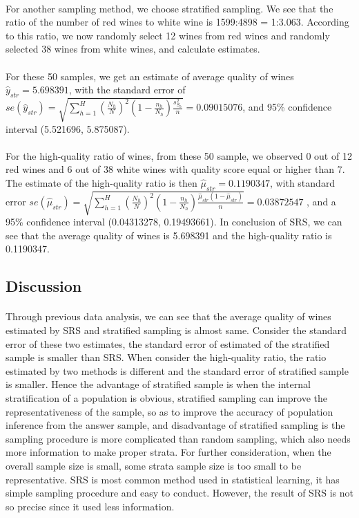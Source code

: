 \documentclass{article}
\begin{document}
\paragraph{}
For another sampling method, we choose stratified sampling. We see that the ratio of the number of red wines to white wine is 1599:4898 = 1:3.063. According to this ratio, we now randomly select 12 wines from red wines and randomly selected 38 wines from white wines, and calculate estimates.
\paragraph{}
For these 50 samples, we get an estimate of average quality of wines  $\hat{y}_{str}=5.698391$, with the standard error of $se(\hat{y}_{str})=\sqrt{\sum_{h=1}^{H}({\frac{{N}_{h}}{N}})^2(1-\frac{{n}_{h}}{{N}_{h}})\frac{{s}^{2}_{{S}_{h}}}{n}}=0.09015076$, and 95\% confidence interval (5.521696, 5.875087).
\paragraph{}
For the high-quality ratio of wines, from these 50 sample, we observed 0 out of 12 red wines and 6 out of 38 white wines with quality score equal or higher than 7. The estimate of the high-quality ratio is then $\hat{\mu}_{str}=0.1190347$, with standard error $se(\hat{\mu}_{str})=\sqrt{\sum_{h=1}^{H}({\frac{{N}_{h}}{N}})^2(1-\frac{{n}_{h}}{{N}_{h}})\frac{\hat{\mu}_{str}(1-\hat{\mu}_{str})}{n}}=0.03872547$ , and a 95\% confidence interval (0.04313278, 0.19493661).
In conclusion of SRS, we can see that the average quality of wines is 5.698391 and the high-quality ratio is 0.1190347.
\subsection{Discussion}
\paragraph{}
Through previous data analysis, we can see that the average quality of wines estimated by SRS and stratified sampling is almost same. Consider the standard error of these two estimates, the standard error of estimated of the stratified sample is smaller than SRS. When consider the high-quality ratio, the ratio estimated by two methods is different and the standard error of stratified sample is smaller. Hence the advantage of stratified sample is when the internal stratification of a population is obvious, stratified sampling can improve the representativeness of the sample, so as to improve the accuracy of population inference from the answer sample, and disadvantage of stratified sampling is the sampling procedure is more complicated than random sampling, which also needs more information to make proper strata. For further consideration, when the overall sample size is small, some strata sample size is too small to be representative. SRS is most common method used in statistical learning, it has simple sampling procedure and easy to conduct. However, the result of SRS is not so precise since it used less information.
\end{document}
